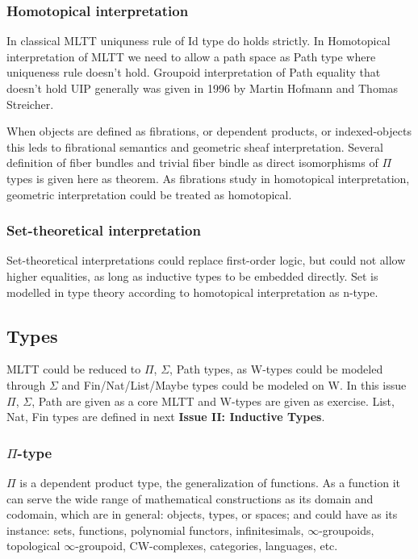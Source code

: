 \documentclass[twoside]{article}
\theoremstyle{definition}
\begin{document}
\subsubsection{Homotopical interpretation}

In classical MLTT uniquness rule of Id type do holds strictly. In Homotopical
interpretation of MLTT we need to allow a path space as Path type where uniqueness
rule doesn't hold. Groupoid interpretation of Path equality that doesn't hold UIP generally
was given in 1996 by Martin Hofmann and Thomas Streicher\cite{Hofmann96}.

When objects are defined as fibrations, or dependent products, or indexed-objects
this leds to fibrational semantics and geometric sheaf interpretation. Several definition
of fiber bundles and trivial fiber bindle as direct isomorphisms of $\Pi$ types is
given here as theorem. As fibrations study in homotopical interpretation, geometric
interpretation could be treated as homotopical.

\subsubsection{Set-theoretical interpretation}

Set-theoretical interpretations could replace first-order logic, but could not allow
higher equalities, as long as inductive types to be embedded directly. Set is modelled
in type theory according to homotopical interpretation as n-type.

\subsection{Types}

MLTT could be reduced to $\Pi$, $\Sigma$, Path types, as W-types could be
modeled through $\Sigma$ and Fin/Nat/List/Maybe types could be modeled on W.
In this issue $\Pi$, $\Sigma$, Path are given as a core MLTT and W-types
are given as exercise. List, Nat, Fin types are defined in next {\bf Issue II: Inductive Types}.

\subsubsection{$\Pi$-type}

$\Pi$ is a dependent product type, the generalization of functions.
As a function it can serve the wide range of mathematical constructions as its domain and codomain,
which are in general: objects, types, or spaces; and could have as its
instance: sets, functions, polynomial functors, infinitesimals, $\infty$-groupoids,
topological $\infty$-groupoid, CW-complexes,
categories, languages, etc.
\end{document}
